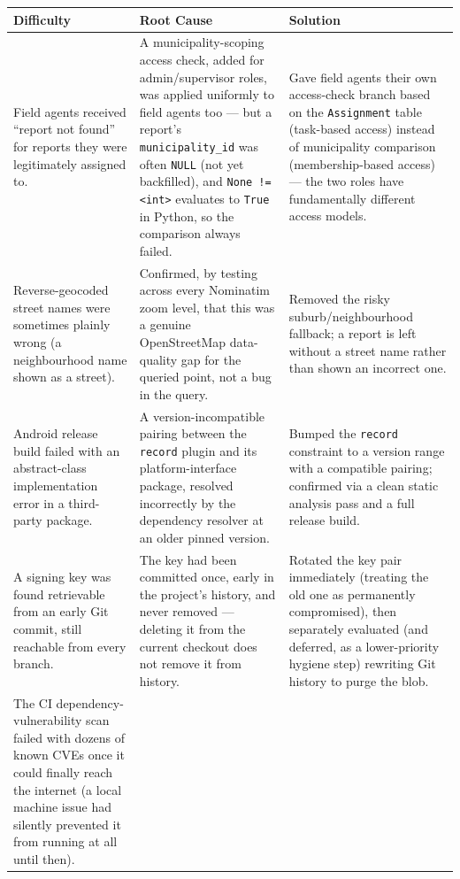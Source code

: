\begin{table}[h!]
\centering
\begin{tabularx}{\textwidth}{p{3.6cm}Xp{4.7cm}}
\toprule
\textbf{Difficulty} & \textbf{Root Cause} & \textbf{Solution} \\
\midrule
Field agents received ``report not found'' for reports they were legitimately assigned to. &
A municipality-scoping access check, added for admin/supervisor roles, was applied uniformly to field agents too --- but a report's \texttt{municipality\_id} was often \texttt{NULL} (not yet backfilled), and \texttt{None != <int>} evaluates to \texttt{True} in Python, so the comparison always failed. &
Gave field agents their own access-check branch based on the \texttt{Assignment} table (task-based access) instead of municipality comparison (membership-based access) --- the two roles have fundamentally different access models. \\
\addlinespace
Reverse-geocoded street names were sometimes plainly wrong (a neighbourhood name shown as a street). &
Confirmed, by testing across every Nominatim zoom level, that this was a genuine OpenStreetMap data-quality gap for the queried point, not a bug in the query. &
Removed the risky suburb/neighbourhood fallback; a report is left without a street name rather than shown an incorrect one. \\
\addlinespace
Android release build failed with an abstract-class implementation error in a third-party package. &
A version-incompatible pairing between the \texttt{record} plugin and its platform-interface package, resolved incorrectly by the dependency resolver at an older pinned version. &
Bumped the \texttt{record} constraint to a version range with a compatible pairing; confirmed via a clean static analysis pass and a full release build. \\
\addlinespace
A signing key was found retrievable from an early Git commit, still reachable from every branch. &
The key had been committed once, early in the project's history, and never removed --- deleting it from the current checkout does not remove it from history. &
Rotated the key pair immediately (treating the old one as permanently compromised), then separately evaluated (and deferred, as a lower-priority hygiene step) rewriting Git history to purge the blob. \\
\addlinespace
The CI dependency-vulnerability scan failed with dozens of known CVEs once it could finally reach the internet (a local machine issue had silently prevented it from running at all until then). &

\end{tabularx}
\end{table}
